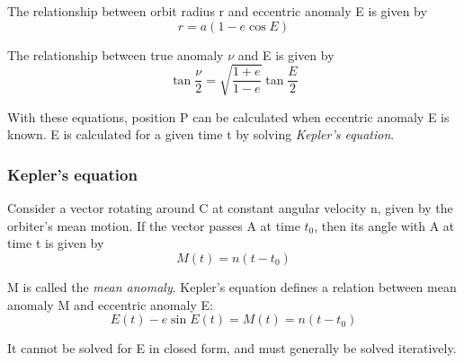 \documentclass[Orbiter Developer Manual.tex]{subfiles}
\begin{document}
\noindent
The relationship between orbit radius r and eccentric anomaly E is given by
\[ r = a(1-e \cos E) \]

\noindent
The relationship between true anomaly $\nu$ and E is given by
\[ \tan \frac{\nu}{2} = \sqrt{ \frac{1+e}{1-e}} \tan \frac{E}{2} \]

\noindent
With these equations, position P can be calculated when eccentric anomaly E is known. E is calculated for a given time t by solving \textit{Kepler's equation}.


\subsubsection{Kepler's equation}
Consider a vector rotating around C at constant angular velocity n, given by the orbiter's mean motion. If the vector passes A at time $t_{0}$, then its angle with A at time t is given by
\[ M(t) = n(t-t_0) \]

\noindent
M is called the \textit{mean anomaly}. Kepler's equation defines a relation between mean anomaly M and eccentric anomaly E:
\[ E(t) - e \sin E(t) = M(t) = n(t-t_0) \]

\noindent
It cannot be solved for E in closed form, and must generally be solved iteratively.
\end{document}
